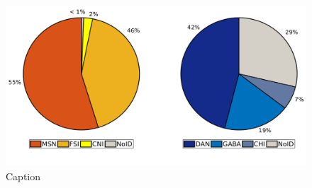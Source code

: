 \begin{figure}
  \centering
    \includegraphics[scale=0.6]{figures/PieGroup.png}
   \caption{Caption}
    \label{fig:PieRegions}
\end{figure}
